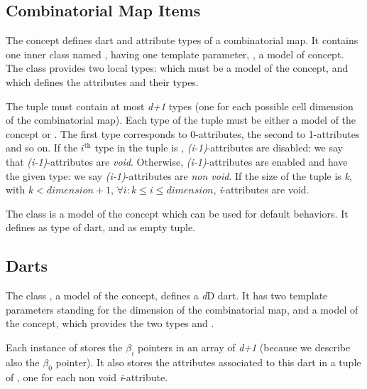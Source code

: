 \subsection{Combinatorial Map Items}\label{ssec-item}

The  concept defines dart and attribute
types of a combinatorial map. It contains one inner class named
, having one template parameter, , a model
of  concept.  The  class
provides two local types:  which must be a model of the
 concept, and  which defines the attributes
and their types.

The  tuple must contain at most \emph{d+1} types (one for
each possible cell dimension of the combinatorial map).  Each type of
the tuple must be either a model of the  concept or
.  The first type corresponds to 0-attributes, the second to
1-attributes and so on. If the $i^{\mbox{th}}$ type in the tuple is
, \emph{(i-1)}-attributes are disabled: we say that
\emph{(i-1)}-attributes are \emph{void}.  Otherwise, \emph{(i-1)}-attributes are
enabled and have the given type: we say \emph{(i-1)}-attributes are
\emph{non void}.  If the size of the tuple is \emph{k}, with $k <
dimension+1$, $\forall i: k \leq i \leq dimension$, \emph{i}-attributes are
void.

The class  is a model of the
 concept which can be used for default behaviors.
It defines  as type of dart, and
 as empty tuple.

\subsection{Darts}\label{ssec-darts}

The class , a model of the  concept,
defines a \emph{d}D dart. It has two template parameters standing for the
dimension of the combinatorial map, and a model of the
 concept, which provides the two types
 and . 

Each instance  of  stores the $\beta_i$ pointers in an
array of \emph{d+1}  (because we describe also the
$\beta_0$ pointer).  It also stores the attributes associated to this
dart in a tuple of , one for each
non void \emph{i}-attribute.

